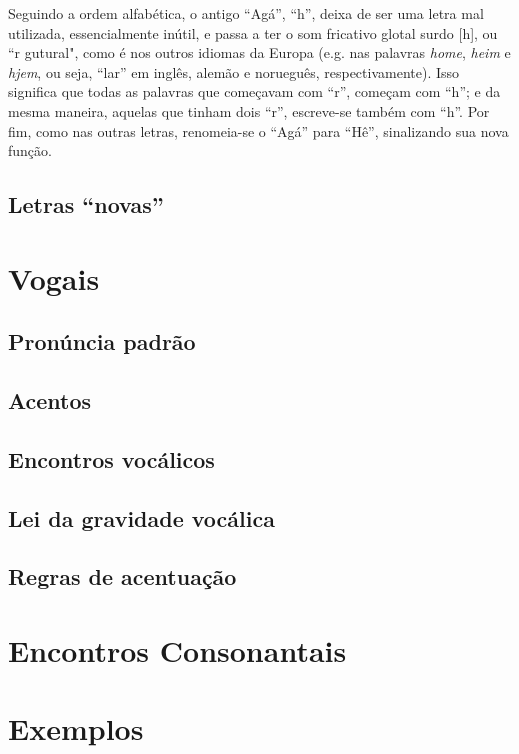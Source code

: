 \documentclass[12pt, a4paper]{article}
\begin{document}
\begin{bilingualpages}
    Seguindo a ordem alfabética, o antigo ``Agá'', ``h'', deixa de ser uma letra mal utilizada, essencialmente inútil, e passa a ter o som fricativo glotal surdo [h], ou ``r gutural", como é nos outros idiomas da Europa (e.g. nas palavras \textit{home}, \textit{heim} e \textit{hjem}, ou seja, ``lar'' em inglês, alemão e norueguês, respectivamente). Isso significa que todas as palavras que começavam com ``r'', começam com ``h''; e da mesma maneira, aquelas que tinham dois ``r'', escreve-se também com ``h''. Por fim, como nas outras letras, renomeia-se o ``Agá'' para ``Hê'', sinalizando sua nova função.

    \subsection{Letras ``novas''}
    
    \section{Vogais}

    \subsection{Pronúncia padrão}
    \subsection{Acentos}
    \subsection{Encontros vocálicos}
    \subsection{Lei da gravidade vocálica}
    \subsection{Regras de acentuação}
    
    \section{Encontros Consonantais}
    
    \section{Exemplos}
    

\end{bilingualpages}
\end{document}

